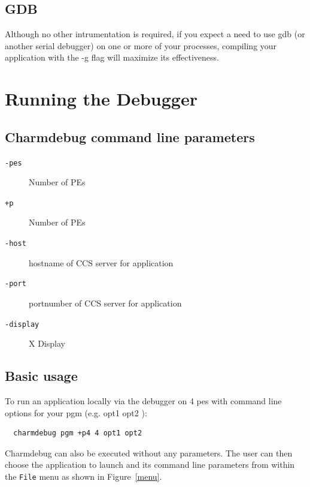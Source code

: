 \documentclass[10pt]{article}
\begin{document}
\subsection{GDB}

Although no other intrumentation is required, if you expect a need to
use gdb (or another serial debugger) on one or more of your processes,
compiling your application with the -g flag will maximize its
effectiveness.

\section{Running the Debugger}

\subsection{Charmdebug command line parameters}

\begin{description}

\item[{\tt -pes}] Number of PEs 

\item[{\tt +p}] Number of PEs 

\item[{\tt -host}] hostname of CCS server for application

\item[{\tt -port}] portnumber of CCS server for application

\item[{\tt -display}] X Display

\end{description}

\subsection{Basic usage}

To run an application locally via the debugger on 4 pes with command line options for your pgm (e.g. opt1 opt2 ):

\begin{verbatim}
  charmdebug pgm +p4 4 opt1 opt2
\end{verbatim}

Charmdebug can also be executed without any parameters.  The user can
then choose the application to launch and its command line parameters
from within the \texttt{File} menu as shown in Figure~\ref{menu}.
\end{document}
